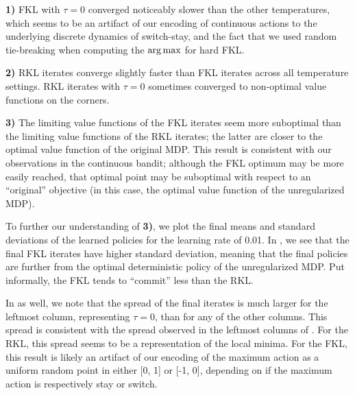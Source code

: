 \documentclass[\main/thesis.tex]{subfiles}
\begin{document}
\textbf{1)} FKL with $\tau = 0$ converged noticeably slower than the other temperatures, which seems to be an artifact of our encoding of continuous actions to the underlying discrete dynamics of switch-stay, and the fact that we used random tie-breaking when computing the $\operatorname*{arg\,max}$ for hard FKL. 

\textbf{2)} RKL iterates converge slightly faster than FKL iterates across all temperature settings. RKL iterates with $\tau = 0$ sometimes converged to non-optimal value functions on the corners. 

\textbf{3)} The limiting value functions of the FKL iterates seem more suboptimal than the limiting value functions of the RKL iterates; the latter are closer to the optimal value function of the original MDP. This result is consistent with our observations in the continuous bandit; although the FKL optimum may be more easily reached, that optimal point may be suboptimal with respect to an ``original'' objective (in this case, the optimal value function of the unregularized MDP). 

To further our understanding of \textbf{3)}, we plot the final means and standard deviations of the learned policies for the learning rate of 0.01. In , we see that the final FKL iterates have higher standard deviation, meaning that the final policies are further from the optimal deterministic policy of the unregularized MDP. Put informally, the FKL tends to ``commit'' less than the RKL.  

In  as well, we note that the spread of the final iterates is much larger for the leftmost column, representing $\tau = 0$, than for any of the other columns. This spread is consistent with the spread observed in the leftmost columns of . For the RKL, this spread seems to be a representation of the local minima. For the FKL, this result is likely an artifact of our encoding of the maximum action as a uniform random point in either [0, 1] or [-1, 0], depending on if the maximum action is respectively stay or switch. 

  
\end{document}
